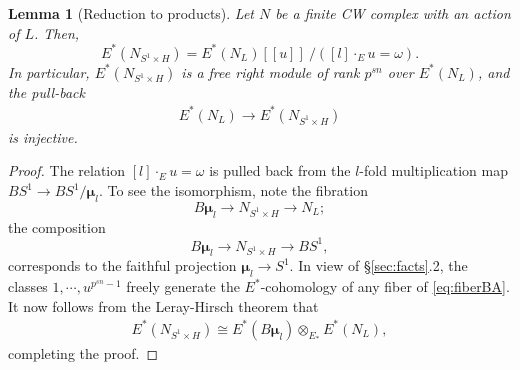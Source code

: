 \documentclass[11pt, reqno]{amsart}
\theoremstyle{plain}
\newtheorem{lem}[thm]{Lemma}
\theoremstyle{definition}
\begin{document}
\begin{lem}[Reduction to products] \label{lem: finitecovering} 
Let $N$ be a finite CW complex with an action of $L$.  Then,
\[
E^*(N_{S^1\times H}) = 
	E^*(N_{L})[[u]]\:/\left([l]\cdot_E u = \omega\right).
\]
In particular, $E^*(N_{S^1\times H})$ is a free right module of rank $p^{sn}$ over  $E^*(N_{L})$, 
and the pull-back 
\begin{align*} E^*(N_{L}) \to E^*(N_{S^1\times H}) 
\end{align*} 
is injective. 
\end{lem} 

\begin{proof} 
The relation $[l]\cdot_E u = \omega$ is pulled back from the 
$l$-fold multiplication map $BS^1\to BS^1/\boldsymbol{\mu}_l$. 
To see the isomorphism, note the fibration
\begin{equation} \label{eq:fiberBA} 
B\boldsymbol{\mu}_l \to  N_{S^1 \times H} \to  N_{L};
\end{equation} 
the composition  
\[
B\boldsymbol{\mu}_l \to  N_{S^1 \times H} \to  BS^1,
\] 
corresponds to the faithful 
projection $\boldsymbol{\mu}_l \to S^1.$  In view of \S\ref{sec:facts}.2,  the classes 
$1,\cdots,u^{p^{sn}-1}$ freely generate the $E^*$-cohomology of any fiber 
of \eqref{eq:fiberBA}.  It now follows from the Leray-Hirsch theorem that 
\begin{align} 
E^*(N_{S^1 \times H}) \cong E^*(B\boldsymbol{\mu}_l)\otimes_{E_{*}} E^*(N_{L}),
\end{align}  
completing the proof. 
\end{proof}
\end{document}
